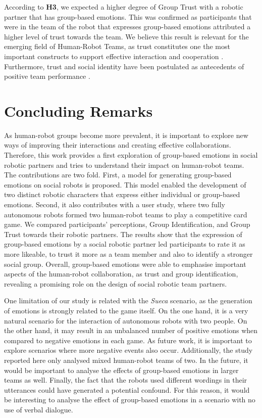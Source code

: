 According to \textbf{H3}, we expected a higher degree of Group Trust with a robotic partner that has group-based emotions. This was confirmed as participants that were in the team of the robot that expresses group-based emotions attributed a higher level of trust towards the team. We believe this result is relevant for the emerging field of Human-Robot Teams, as trust constitutes one the most important constructs to support effective interaction and cooperation \cite{hancock2011meta}. Furthermore, trust and social identity have been postulated as antecedents of positive team performance \cite{allen2004exploring}.


\section{Concluding Remarks}
\label{sec:conclusind-remarks}
As human-robot groups become more prevalent, it is important to explore new ways of improving their interactions and creating effective collaborations. Therefore, this work provides a first exploration of group-based emotions in social robotic partners and tries to understand their impact on human-robot teams. The contributions are two fold. First, a model for generating group-based emotions on social robots is proposed. This model enabled the development of two distinct robotic characters that express either individual or group-based emotions. Second, it also contributes with a user study, where two fully autonomous robots formed two human-robot teams to play a competitive card game. We compared participants' perceptions, Group Identification, and Group Trust towards their robotic partners. The results show that the expression of group-based emotions by a social robotic partner led participants to rate it as more likeable, to trust it more as a team member and also to identify a stronger social group. Overall, group-based emotions were able to emphasise important aspects of the human-robot collaboration, as trust and group identification, revealing a promising role on the design of social robotic team partners.

One limitation of our study is related with the \textit{Sueca} scenario, as the generation of emotions is strongly related to the game itself. On the one hand, it is a very natural scenario for the interaction of autonomous robots with two people. On the other hand, it may result in an unbalanced number of positive emotions when compared to negative emotions in each game. As future work, it is important to explore scenarios where more negative events also occur. Additionally, the study reported here only analysed mixed human-robot teams of two. In the future, it would be important to analyse the effects of group-based emotions in larger teams as well. Finally, the fact that the robots used different wordings in their utterances could have generated a potential confound. For this reason, it would be interesting to analyse the effect of group-based emotions in a scenario with no use of verbal dialogue.

